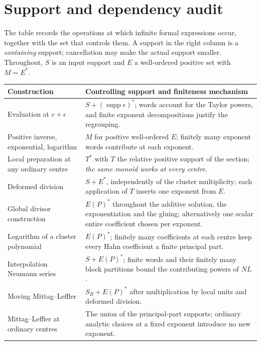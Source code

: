 \documentclass[11pt,letterpaper]{article}
\theoremstyle{definition}
\theoremstyle{remark}
\newcommand{\supp}{\operatorname{supp}}
\numberwithin{equation}{section}
\begin{document}
\appendix

\section{Support and dependency audit}\label{global:app:audit}

The table records the operations at which infinite formal expressions occur, together with the set that controls them. A support in the right column is a \emph{containing} support; cancellation may make the actual support smaller. Throughout, $S$ is an input support and $E$ a well-ordered positive set with $M=E^*$.

\begin{center}\small
\begin{longtable}{@{}L{0.36\textwidth}L{0.55\textwidth}@{}}
\toprule
Construction & Controlling support and finiteness mechanism\\
\midrule
\endhead
Evaluation at $c+\epsilon$ & $S+(\supp\epsilon)^*$; words account for the Taylor powers, and finite exponent decompositions justify the regrouping.\\[0.4em]
Positive inverse, exponential, logarithm & $M$ for positive well-ordered $E$; finitely many exponent words contribute at each exponent.\\[0.4em]
Local preparation at any ordinary centre & $T^*$ with $T$ the relative positive support of the section; \emph{the same monoid works at every centre}.\\[0.4em]
Deformed division & $S+E^*$, independently of the cluster multiplicity; each application of $T$ inserts one exponent from $E$.\\[0.4em]
Global divisor construction & $E(P)^*$ throughout the additive solution, the exponentiation and the gluing; alternatively one scalar entire coefficient chosen per exponent.\\[0.4em]
Logarithm of a cluster polynomial & $E(P)^*$; finitely many coefficients at each centre keep every Hahn coefficient a finite principal part.\\[0.4em]
Interpolation Neumann series & $S+E(P)^*$; finite words and their finitely many block partitions bound the contributing powers of $NL$.\\[0.4em]
Moving Mittag--Leffler & $S_R+E(P)^*$ after multiplication by local units and deformed division.\\[0.4em]
Mittag--Leffler at ordinary centres & The union of the principal-part supports; ordinary analytic choices at a fixed exponent introduce no new exponent.\\[0.4em]

\end{longtable}
\end{center}
\end{document}
